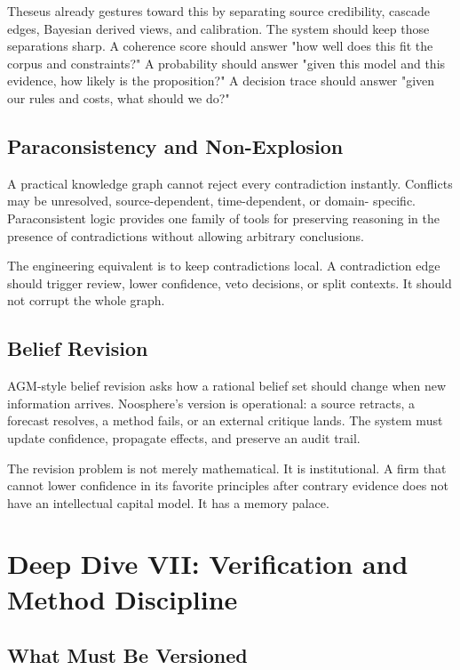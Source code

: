 \documentclass[11pt]{article}
\begin{document}
Theseus already gestures toward this by separating source credibility, cascade
edges, Bayesian derived views, and calibration. The system should keep those
separations sharp. A coherence score should answer "how well does this fit the
corpus and constraints?" A probability should answer "given this model and this
evidence, how likely is the proposition?" A decision trace should answer "given
our rules and costs, what should we do?"

\subsection{Paraconsistency and Non-Explosion}

A practical knowledge graph cannot reject every contradiction instantly.
Conflicts may be unresolved, source-dependent, time-dependent, or domain-
specific. Paraconsistent logic provides one family of tools for preserving
reasoning in the presence of contradictions without allowing arbitrary
conclusions.

The engineering equivalent is to keep contradictions local. A contradiction
edge should trigger review, lower confidence, veto decisions, or split contexts.
It should not corrupt the whole graph.

\subsection{Belief Revision}

AGM-style belief revision asks how a rational belief set should change when new
information arrives. Noosphere's version is operational: a source retracts, a
forecast resolves, a method fails, or an external critique lands. The system
must update confidence, propagate effects, and preserve an audit trail.

The revision problem is not merely mathematical. It is institutional. A firm
that cannot lower confidence in its favorite principles after contrary evidence
does not have an intellectual capital model. It has a memory palace.

\section{Deep Dive VII: Verification and Method Discipline}

\subsection{What Must Be Versioned}
\end{document}
